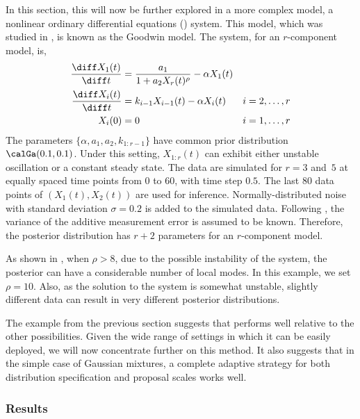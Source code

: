 In this section, this will now be further explored in a more complex model, a
nonlinear ordinary differential equations (\ode) system. This model, which
was studied in \cite{Calderhead:2009bd}, is known as the Goodwin model. The
\ode system, for an $r$-component model, is,
\begin{align*}
  \frac{\diff X_1(t)}{\diff t} &= \frac{a_1}{1 + a_2 X_r(t)^{\rho}}
  - \alpha X_1(t)  & \\
  \frac{\diff X_i(t)}{\diff t} &= k_{i-1}X_{i-1}(t) - \alpha X_i(t)
  & i = 2,\dots,r \\
  X_i(0) &= 0 & i = 1,\dots,r
\end{align*}
The parameters $\{\alpha,a_1,a_2,k_{1:r-1}\}$ have common prior distribution
$\calGa(0.1, 0.1)$. Under this setting, $X_{1:r}(t)$ can exhibit either
unstable oscillation or a constant steady state. The data are simulated for
$r=3$ and~$5$ at equally spaced time points from $0$ to $60$, with time step
$0.5$. The last 80 data points of $(X_1(t), X_2(t))$ are used for inference.
Normally-distributed noise with standard deviation $\sigma=0.2$ is added to
the simulated data. Following \cite{Calderhead:2009bd}, the variance of the
additive measurement error is assumed to be known. Therefore, the posterior
distribution has $r+2$ parameters for an $r$-component model.

As shown in \cite{Calderhead:2009bd}, when $\rho > 8$, due to the possible
instability of the \ode system, the posterior can have a considerable number
of local modes. In this example, we set $\rho = 10$. Also, as the solution to
the \ode system is somewhat unstable, slightly different data can result in
very different posterior distributions.

The example from the previous section suggests that \smc[2] performs well
relative to the other \smc possibilities. Given the wide range of settings in
which it can be easily deployed, we will now concentrate further on this
method. It also suggests that in the simple case of Gaussian mixtures, a
complete adaptive strategy for both distribution specification and proposal
scales works well. 

\subsubsection{Results}

